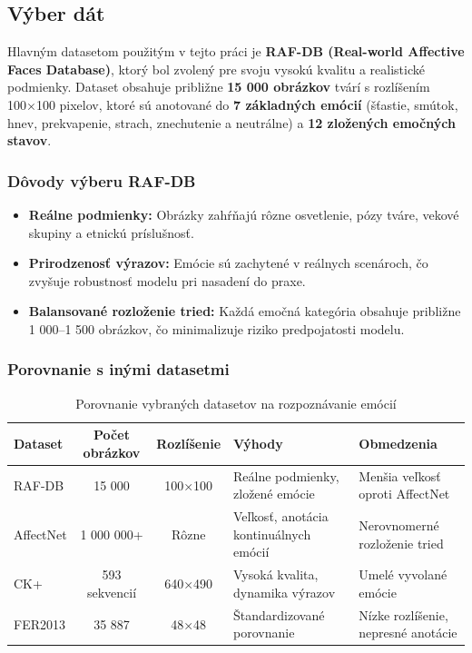 \subsection{Výber dát}
Hlavným datasetom použitým v tejto práci je \textbf{RAF-DB (Real-world Affective Faces Database)}, ktorý bol zvolený pre svoju vysokú kvalitu a realistické podmienky. Dataset obsahuje približne \textbf{15 000 obrázkov} tvárí s rozlíšením 100×100 pixelov, ktoré sú anotované do \textbf{7 základných emócií} (šťastie, smútok, hnev, prekvapenie, strach, znechutenie a neutrálne) a \textbf{12 zložených emočných stavov}. 

\subsubsection{Dôvody výberu RAF-DB}
\begin{itemize}
    \item \textbf{Reálne podmienky:} Obrázky zahŕňajú rôzne osvetlenie, pózy tváre, vekové skupiny a etnickú príslušnosť.
    \item \textbf{Prirodzenosť výrazov:} Emócie sú zachytené v reálnych scenároch, čo zvyšuje robustnosť modelu pri nasadení do praxe.
    \item \textbf{Balansované rozloženie tried:} Každá emočná kategória obsahuje približne 1 000–1 500 obrázkov, čo minimalizuje riziko predpojatosti modelu.
\end{itemize}

\subsubsection{Porovnanie s inými datasetmi}

\begin{table}[h!]
    \centering
    \caption{Porovnanie vybraných datasetov na rozpoznávanie emócií}
    \begin{tabularx}{\textwidth}{|l|c|c|X|X|}
    \hline
    \textbf{Dataset} & \textbf{Počet obrázkov} & \textbf{Rozlíšenie} & \textbf{Výhody} & \textbf{Obmedzenia} \\ \hline
    RAF-DB          & 15 000                  & 100×100            & Reálne podmienky, zložené emócie    & Menšia veľkosť oproti AffectNet \\ \hline
    AffectNet       & 1 000 000+              & Rôzne              & Veľkosť, anotácia kontinuálnych emócií & Nerovnomerné rozloženie tried \\ \hline
    CK+             & 593 sekvencií           & 640×490            & Vysoká kvalita, dynamika výrazov    & Umelé vyvolané emócie \\ \hline
    FER2013         & 35 887                  & 48×48              & Štandardizované porovnanie          & Nízke rozlíšenie, nepresné anotácie \\ \hline
    \end{tabularx}
    \end{table}
